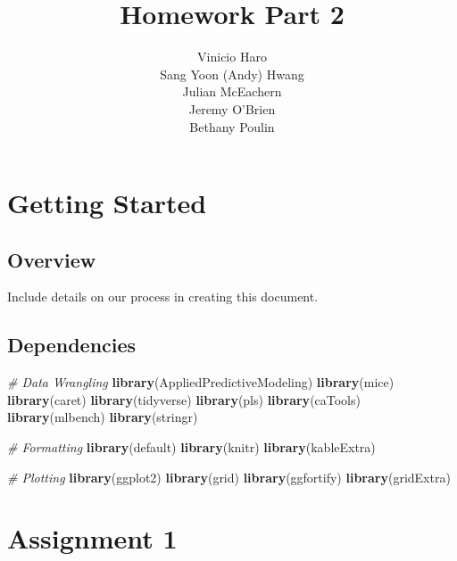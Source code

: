 \documentclass[]{report}
\title{Homework Part 2}
\author{Vinicio Haro \\ Sang Yoon (Andy) Hwang \\ Julian McEachern \\ Jeremy O'Brien \\ Bethany Poulin}
\date{}
\newenvironment{Shaded}{\begin{snugshade}}{\end{snugshade}}
\newcommand{\CommentTok}[1]{\textcolor[rgb]{0.56,0.35,0.01}{\textit{#1}}}
\newcommand{\KeywordTok}[1]{\textcolor[rgb]{0.13,0.29,0.53}{\textbf{#1}}}
\newcommand{\NormalTok}[1]{#1}
\begin{document}
\maketitle

{
\setcounter{tocdepth}{2}
\tableofcontents
}
\hypertarget{Overview}{%
\chapter*{Getting Started}\label{Overview}}

\hypertarget{overview}{%
\section{Overview}\label{overview}}

Include details on our process in creating this document.

\hypertarget{dependencies}{%
\section{Dependencies}\label{dependencies}}

\begin{Shaded}
\begin{Highlighting}[]
\CommentTok{# Data Wrangling}
\KeywordTok{library}\NormalTok{(AppliedPredictiveModeling)}
\KeywordTok{library}\NormalTok{(mice)}
\KeywordTok{library}\NormalTok{(caret)}
\KeywordTok{library}\NormalTok{(tidyverse)}
\KeywordTok{library}\NormalTok{(pls)}
\KeywordTok{library}\NormalTok{(caTools)}
\KeywordTok{library}\NormalTok{(mlbench)}
\KeywordTok{library}\NormalTok{(stringr)}

\CommentTok{# Formatting}
\KeywordTok{library}\NormalTok{(default)}
\KeywordTok{library}\NormalTok{(knitr)}
\KeywordTok{library}\NormalTok{(kableExtra)}

\CommentTok{# Plotting}
\KeywordTok{library}\NormalTok{(ggplot2)}
\KeywordTok{library}\NormalTok{(grid)}
\KeywordTok{library}\NormalTok{(ggfortify)}
\KeywordTok{library}\NormalTok{(gridExtra)}
\end{Highlighting}
\end{Shaded}

\newpage

\hypertarget{AS-1}{%
\chapter*{Assignment 1}\label{AS-1}}
\end{document}
